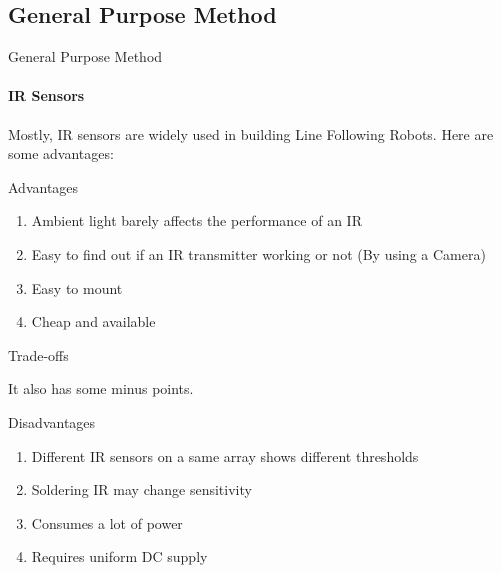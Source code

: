 \documentclass{beamer}
\begin{document}
	\subsection{General Purpose Method}
	\begin{frame}{General Purpose Method}
	
	\framesubtitle{\alert{IR Sensors}}
	
	Mostly, IR sensors are widely used in building Line Following Robots. Here are some advantages:
	
	\begin{alertblock}{Advantages}
	\begin{enumerate}
		\item{Ambient light barely affects the performance of an IR}
		\item{Easy to find out if an IR transmitter working or not (By using a Camera)}
		\item{Easy to mount}
		
		\item{Cheap and available}
	
	\end{enumerate}
	\end{alertblock}
	
	\end{frame}
	
	\begin{frame}{Trade-offs}
	
	It also has some minus points.	
	
	\begin{alertblock}{Disadvantages}
	
	\begin{enumerate}
		\item{Different IR sensors on a same array shows different thresholds}
		\item{Soldering IR may change sensitivity}
		\item{Consumes a lot of power}
		\item{Requires uniform DC supply}
\end{enumerate}		
	
	\end{alertblock}
		
	\end{frame}
	
\end{document}

